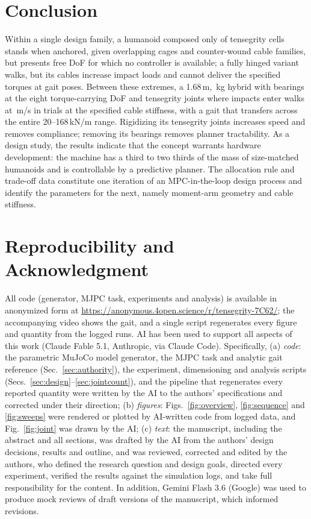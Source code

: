 \documentclass[letterpaper, 10pt, conference]{ieeeconf}
\begin{document}
\section{Conclusion}
Within a single design family, a humanoid composed only of tensegrity
cells stands when anchored, given overlapping cages and counter-wound
cable families, but presents \cgDof{} free DoF for which no controller is
available; a fully hinged variant walks, but its cables increase impact
loads and cannot deliver the specified torques at gait poses. Between
these extremes, a 1.68\,m, \hybridMass\,kg hybrid with bearings at the
eight torque-carrying DoF and tensegrity joints where impacts enter walks
at \headV\,m/s in \headRate{} trials at the specified cable stiffness,
with a gait that transfers across the entire 20--168\,kN/m range.
Rigidizing its tensegrity joints increases speed and removes compliance;
removing its bearings removes planner tractability. As a design study, the
results indicate that the concept warrants hardware development: the
machine has a third to two thirds of the mass of size-matched humanoids
and is controllable by a predictive planner. The allocation rule and trade-off
data constitute one iteration of an MPC-in-the-loop design process and
identify the parameters for the next, namely moment-arm geometry and cable
stiffness.

\section*{Reproducibility and Acknowledgment}
All code (generator, MJPC task, experiments and analysis) is available in
anonymized form at \url{https://anonymous.4open.science/r/tensegrity-7C62/};
the accompanying video shows the gait, and a single script regenerates every
figure and quantity from the logged runs. AI has been used to support all aspects of this work (Claude Fable 5.1,
Anthropic, via Claude Code). Specifically, (a) \emph{code}: the parametric
MuJoCo model generator, the MJPC task and analytic gait reference
(Sec.~\ref{sec:authority}), the experiment, dimensioning and analysis
scripts (Secs.~\ref{sec:design}--\ref{sec:jointcount}), and the pipeline
that regenerates every reported quantity were written by the AI to the
authors' specifications and corrected under their direction;
(b) \emph{figures}: Figs.~\ref{fig:overview}, \ref{fig:sequence} and
\ref{fig:sweeps} were rendered or plotted by AI-written code from logged
data, and Fig.~\ref{fig:joint} was drawn by the AI; (c) \emph{text}: the
manuscript, including the abstract and all sections, was drafted by the AI
from the authors' design decisions, results and outline, and was reviewed,
corrected and edited by the authors, who defined the research question and
design goals, directed every experiment, verified the results against the
simulation logs, and take full responsibility for the content. In
addition, Gemini Flash 3.6 (Google) was used to produce mock reviews of
draft versions of the manuscript, which informed revisions.



\end{document}
